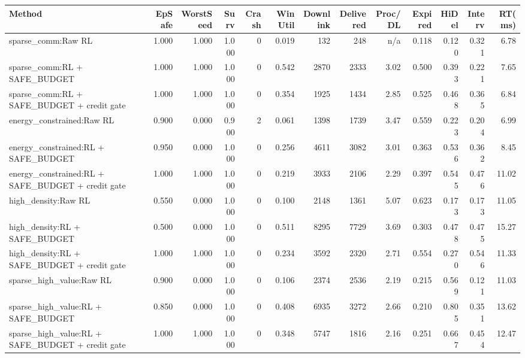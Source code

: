 \begin{tabular}{lrrrrrrrrrrrr}
\hline
Method & EpSafe & WorstSeed & Surv & Crash & WinUtil & Downlink & Delivered & Proc/DL & Expired & HiDel & Interv & RT(ms) \\
\hline
sparse\_comm:Raw RL & 1.000 & 1.000 & 1.000 & 0 & 0.019 & 132 & 248 & n/a & 0.118 & 0.120 & 0.321 & 6.78 \\
sparse\_comm:RL + SAFE\_BUDGET & 1.000 & 1.000 & 1.000 & 0 & 0.542 & 2870 & 2333 & 3.02 & 0.500 & 0.393 & 0.221 & 7.65 \\
sparse\_comm:RL + SAFE\_BUDGET + credit gate & 1.000 & 1.000 & 1.000 & 0 & 0.354 & 1925 & 1434 & 2.85 & 0.525 & 0.468 & 0.365 & 6.84 \\
energy\_constrained:Raw RL & 0.900 & 0.000 & 0.900 & 2 & 0.061 & 1398 & 1739 & 3.47 & 0.559 & 0.223 & 0.204 & 6.99 \\
energy\_constrained:RL + SAFE\_BUDGET & 0.950 & 0.000 & 1.000 & 0 & 0.256 & 4611 & 3082 & 3.01 & 0.363 & 0.536 & 0.362 & 8.45 \\
energy\_constrained:RL + SAFE\_BUDGET + credit gate & 1.000 & 1.000 & 1.000 & 0 & 0.219 & 3933 & 2106 & 2.29 & 0.397 & 0.545 & 0.476 & 11.02 \\
high\_density:Raw RL & 0.550 & 0.000 & 1.000 & 0 & 0.100 & 2148 & 1361 & 5.07 & 0.623 & 0.173 & 0.173 & 11.05 \\
high\_density:RL + SAFE\_BUDGET & 0.500 & 0.000 & 1.000 & 0 & 0.511 & 8295 & 7729 & 3.69 & 0.303 & 0.478 & 0.475 & 15.27 \\
high\_density:RL + SAFE\_BUDGET + credit gate & 1.000 & 1.000 & 1.000 & 0 & 0.234 & 3592 & 2320 & 2.71 & 0.554 & 0.270 & 0.546 & 11.33 \\
sparse\_high\_value:Raw RL & 0.900 & 0.000 & 1.000 & 0 & 0.106 & 2374 & 2536 & 2.19 & 0.215 & 0.569 & 0.121 & 11.03 \\
sparse\_high\_value:RL + SAFE\_BUDGET & 0.850 & 0.000 & 1.000 & 0 & 0.408 & 6935 & 3272 & 2.66 & 0.210 & 0.805 & 0.351 & 13.62 \\
sparse\_high\_value:RL + SAFE\_BUDGET + credit gate & 1.000 & 1.000 & 1.000 & 0 & 0.348 & 5747 & 1816 & 2.16 & 0.251 & 0.667 & 0.454 & 12.47 \\
\hline
\end{tabular}
